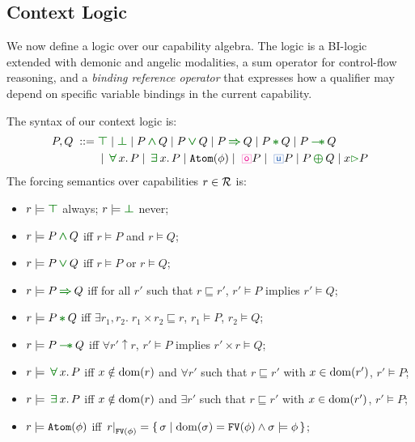\subsection{Context Logic} %
\label{subsec:logic}

We now define a logic over our capability algebra.  The logic is a BI-logic extended with demonic and angelic modalities, a sum operator for
control-flow reasoning, and a \emph{binding reference operator} that
expresses how a qualifier may depend on specific variable bindings in
the current capability.

\vspace{0.2em}
\begin{definition}\label{def:context-logic}
  The syntax of our context logic is:
  \vspace{-0.2em}
  \begin{align*}
    P, Q \;::=\; &\chtrue \mid \chfalse \mid P \chland Q \mid P \chlor Q \mid P \chimpl Q \mid P \chstar Q \mid P \chwand Q
    \\& \mid \chforall x.\, P \mid \chexists x.\, P \mid \Code{Atom}(\phi)
    \mid \demonic P \mid \angelic P \mid P \choplus Q \mid \forallM{x} P
  \end{align*}
  The forcing semantics over capabilities $r \in \mathcal{R}$ is:
  \begin{itemize}
  \item $r \models \chtrue$ always; \quad $r \models \chfalse$ never;
  \item $r \models P \chland Q$ iff $r \models P$ and $r \models Q$;
  \item $r \models P \chlor Q$ iff $r \models P$ or $r \models Q$;
  \item $r \models P \chimpl Q$ iff for all $r'$ such that $r \sqsubseteq r'$, $r' \models P$ implies $r' \models Q$;
  \item $r \models P \chstar Q$ iff $\exists r_1, r_2.\; r_1 \times r_2 \sqsubseteq r$,\; $r_1 \models P$,\; $r_2 \models Q$;
  \item $r \models P \chwand Q$ iff $\forall r' \uparrow r$,\; $r' \models P$ implies $r' \times r \models Q$;
  \item $r \models \chforall x.\, P$ iff $x \notin \mathrm{dom}(r)$ and $\forall r'$ such that $r \sqsubseteq r'$ with $x \in \mathrm{dom}(r')$,\; $r' \models P$;
  \item $r \models \chexists x.\, P$ iff $x \notin \mathrm{dom}(r)$ and $\exists r'$ such that $r \sqsubseteq r'$ with $x \in \mathrm{dom}(r')$,\; $r' \models P$;
  \item $r \models {\tt Atom}(\phi)$ iff $\left.{r}\right|_{{\tt FV}(\phi)} = \{\,\sigma \mid \mathrm{dom}(\sigma) = {\tt FV}(\phi) \land \sigma \models \phi\,\}$;

\end{itemize}
\end{definition}

